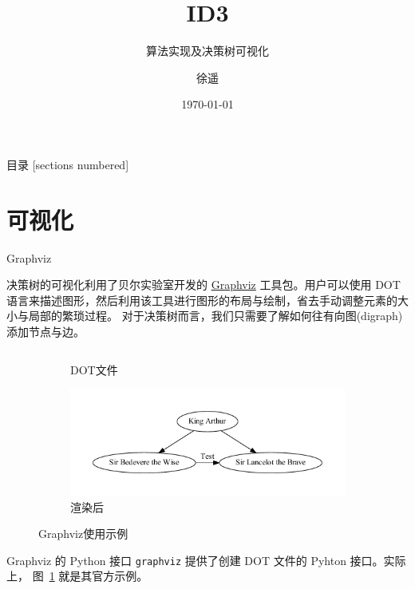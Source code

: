 \documentclass[10pt]{beamer}
\title{ID3}
\subtitle{算法实现及决策树可视化}
\date{\today}
\author{徐遥}
\begin{document}
\maketitle

\begin{frame}{目录}
  [sections numbered]
  \tableofcontents[hideallsubsections]
\end{frame}

\section{可视化}

\begin{frame}[fragile]{Graphviz}

决策树的可视化利用了贝尔实验室开发的 \href{http://www.graphviz.org/}{Graphviz} 工具包。用户可以使用
DOT 语言来描述图形，然后利用该工具进行图形的布局与绘制，省去手动调整元素的大小与局部的繁琐过程。
对于决策树而言，我们只需要了解如何往有向图(digraph)添加节点与边。
\begin{figure}[!tbp]
  \begin{subfigure}[b]{0.48\textwidth}
    \inputminted[mathescape,breaklines,breakautoindent,fontsize=\tiny]{C}{./figures/graphviz_demo}
    \caption{DOT文件}
  \end{subfigure}
  \hfill
  \begin{subfigure}[b]{0.48\textwidth}
    \includegraphics[width=\textwidth]{./figures/graphviz_demo.pdf}
    \caption{渲染后}
  \end{subfigure}
  \caption{Graphviz使用示例}\label{fig:dot_demo}
\end{figure}

\end{frame}

\begin{frame}[fragile]{Graphviz 的 Python 接口}
\texttt{graphviz} 提供了创建 DOT 文件的 Pyhton 接口。实际上，
图~\ref{fig:dot_demo} 就是其官方示例。
\inputminted[mathescape,linenos,frame=lines,framesep=2mm,breaklines,breakautoindent,fontsize=\small]{python}{./codes/graphviz_demo.py}
\end{frame}
\end{document}
